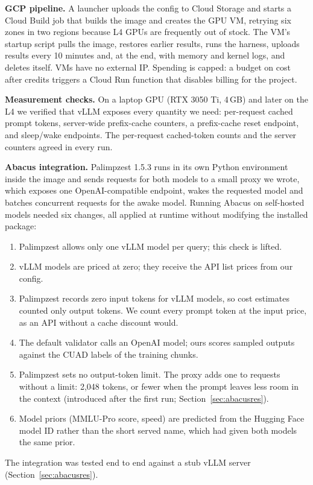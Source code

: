 \documentclass[11pt,a4paper]{article}
\begin{document}
\textbf{GCP pipeline.} A launcher uploads the config to Cloud Storage and starts a Cloud Build job
that builds the image and creates the GPU VM, retrying six zones in two regions because L4 GPUs are
frequently out of stock. The VM's startup script pulls the image, restores earlier results, runs the
harness, uploads results every 10 minutes and, at the end, with memory and kernel logs, and deletes itself. VMs have no external IP.
Spending is capped: a budget on cost after credits triggers a Cloud Run function that disables
billing for the project.

\textbf{Measurement checks.} On a laptop GPU (RTX 3050 Ti, 4\,GB) and later on the L4 we verified that
vLLM exposes every quantity we need: per-request cached prompt tokens, server-wide prefix-cache
counters, a prefix-cache reset endpoint, and sleep/wake endpoints. The per-request cached-token
counts and the server counters agreed in every run.

\textbf{Abacus integration.} Palimpzest 1.5.3 runs in its own Python environment inside the image and
sends requests for both models to a small proxy we wrote, which exposes one OpenAI-compatible
endpoint, wakes the requested model and batches concurrent requests for the awake model. Running
Abacus on self-hosted models needed six changes, all applied at runtime without modifying the
installed package:
\begin{enumerate}\itemsep0em
\item Palimpzest allows only one vLLM model per query; this check is lifted.
\item vLLM models are priced at zero; they receive the API list prices from our config.
\item Palimpzest records zero input tokens for vLLM models, so cost estimates counted only output
tokens. We count every prompt token at the input price, as an API without a cache discount would.
\item The default validator calls an OpenAI model; ours scores sampled outputs against the CUAD
labels of the training chunks.
\item Palimpzest sets no output-token limit. The proxy adds one to requests without a limit: 2,048
tokens, or fewer when the prompt leaves less room in the context (introduced after the first run;
Section~\ref{sec:abacusres}).
\item Model priors (MMLU-Pro score, speed) are predicted from the Hugging Face model ID rather than
the short served name, which had given both models the same prior.
\end{enumerate}
The integration was tested end to end against a stub vLLM server (Section~\ref{sec:abacusres}).
\end{document}
